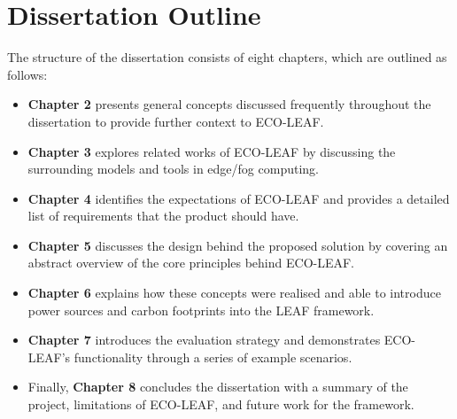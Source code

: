 \documentclass{l4proj}
\begin{document}
\section{Dissertation Outline}
The structure of the dissertation consists of eight chapters, which are outlined as follows:
\begin{itemize}
    \item \textbf{Chapter 2} presents general concepts discussed frequently throughout the dissertation to provide further context to ECO-LEAF.
    \item \textbf{Chapter 3} explores related works of ECO-LEAF by discussing the surrounding models and tools in edge/fog computing.
    \item \textbf{Chapter 4} identifies the expectations of ECO-LEAF and provides a detailed list of requirements that the product should have.
    \item \textbf{Chapter 5} discusses the design behind the proposed solution by covering an abstract overview of the core principles behind ECO-LEAF.
    \item \textbf{Chapter 6} explains how these concepts were realised and able to introduce power sources and carbon footprints into the LEAF framework.
    \item \textbf{Chapter 7} introduces the evaluation strategy and demonstrates ECO-LEAF's functionality through a series of example scenarios.
    \item Finally, \textbf{Chapter 8} concludes the dissertation with a summary of the project, limitations of ECO-LEAF, and future work for the framework.
\end{itemize}
\end{document}

